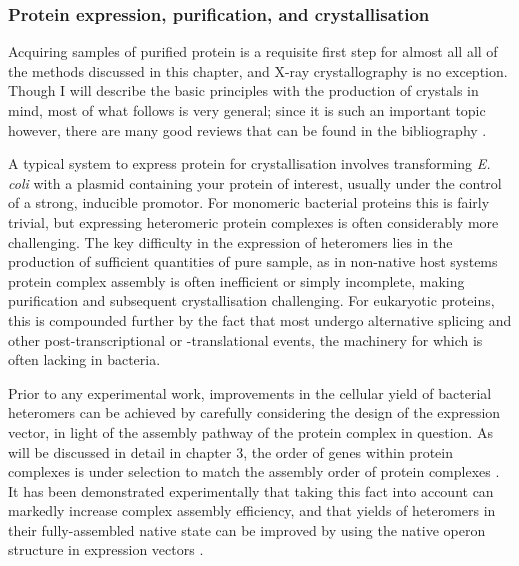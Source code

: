 \documentclass[a4paper,11pt,twoside,openright]{scrbook}
\begin{document}
\subsubsection{Protein expression, purification, and crystallisation}
Acquiring samples of purified protein is a requisite first step for almost all all of the methods discussed in this chapter, and X-ray crystallography is no exception. Though I will describe the basic principles with the production of crystals in mind, most of what follows is very general; since it is such an important topic however, there are many good reviews that can be found in the bibliography \cite{purification}.

A typical system to express protein for crystallisation involves transforming \textit{E. coli} with a plasmid containing your protein of interest, usually under the control of a strong, inducible promotor. For monomeric bacterial proteins this is fairly trivial, but expressing heteromeric protein complexes is often considerably more challenging. The key difficulty in the expression of heteromers lies in the production of sufficient quantities of pure sample, as in non-native host systems protein complex assembly is often inefficient or simply incomplete, making purification and subsequent crystallisation challenging. For eukaryotic proteins, this is compounded further by the fact that most undergo alternative splicing and other post-transcriptional or -translational events, the machinery for which is often lacking in bacteria.

Prior to any experimental work, improvements in the cellular yield of bacterial heteromers can be achieved by carefully considering the design of the expression vector, in light of the assembly pathway of the protein complex in question. As will be discussed in detail in chapter 3, the order of genes within protein complexes is under selection to match the assembly order of protein complexes \cite{Wells2016}. It has been demonstrated experimentally that taking this fact into account can markedly increase complex assembly efficiency, and that yields of heteromers in their fully-assembled native state can be improved by using the native operon structure in expression vectors \cite{Shieh2015a, Poulsen2010}.
\end{document}
